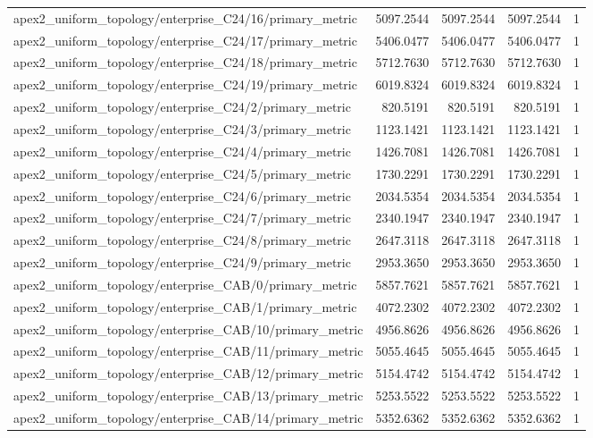 \begin{table}[h]
\begin{tabular}{lrrrr}
apex2_uniform_topology/enterprise_C24/16/primary_metric & 5097.2544 & 5097.2544 & 5097.2544 & 1 \\
apex2_uniform_topology/enterprise_C24/17/primary_metric & 5406.0477 & 5406.0477 & 5406.0477 & 1 \\
apex2_uniform_topology/enterprise_C24/18/primary_metric & 5712.7630 & 5712.7630 & 5712.7630 & 1 \\
apex2_uniform_topology/enterprise_C24/19/primary_metric & 6019.8324 & 6019.8324 & 6019.8324 & 1 \\
apex2_uniform_topology/enterprise_C24/2/primary_metric & 820.5191 & 820.5191 & 820.5191 & 1 \\
apex2_uniform_topology/enterprise_C24/3/primary_metric & 1123.1421 & 1123.1421 & 1123.1421 & 1 \\
apex2_uniform_topology/enterprise_C24/4/primary_metric & 1426.7081 & 1426.7081 & 1426.7081 & 1 \\
apex2_uniform_topology/enterprise_C24/5/primary_metric & 1730.2291 & 1730.2291 & 1730.2291 & 1 \\
apex2_uniform_topology/enterprise_C24/6/primary_metric & 2034.5354 & 2034.5354 & 2034.5354 & 1 \\
apex2_uniform_topology/enterprise_C24/7/primary_metric & 2340.1947 & 2340.1947 & 2340.1947 & 1 \\
apex2_uniform_topology/enterprise_C24/8/primary_metric & 2647.3118 & 2647.3118 & 2647.3118 & 1 \\
apex2_uniform_topology/enterprise_C24/9/primary_metric & 2953.3650 & 2953.3650 & 2953.3650 & 1 \\
apex2_uniform_topology/enterprise_CAB/0/primary_metric & 5857.7621 & 5857.7621 & 5857.7621 & 1 \\
apex2_uniform_topology/enterprise_CAB/1/primary_metric & 4072.2302 & 4072.2302 & 4072.2302 & 1 \\
apex2_uniform_topology/enterprise_CAB/10/primary_metric & 4956.8626 & 4956.8626 & 4956.8626 & 1 \\
apex2_uniform_topology/enterprise_CAB/11/primary_metric & 5055.4645 & 5055.4645 & 5055.4645 & 1 \\
apex2_uniform_topology/enterprise_CAB/12/primary_metric & 5154.4742 & 5154.4742 & 5154.4742 & 1 \\
apex2_uniform_topology/enterprise_CAB/13/primary_metric & 5253.5522 & 5253.5522 & 5253.5522 & 1 \\
apex2_uniform_topology/enterprise_CAB/14/primary_metric & 5352.6362 & 5352.6362 & 5352.6362 & 1 \\

\end{tabular}
\end{table}
